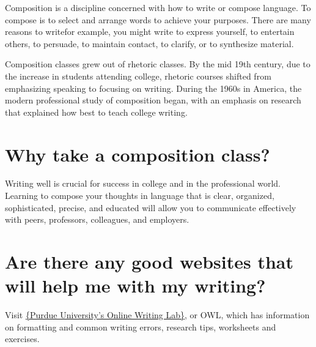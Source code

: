 Composition is a discipline concerned with how to write or compose language. To 
compose is to select and arrange words to achieve your purposes. There are many 
reasons to write\textemdash for example, you might write to express yourself, to entertain others, 
to persuade, to maintain contact, to clarify, or to synthesize material.

Composition classes grew out of rhetoric classes. By the mid 19th century, due to the 
increase in students attending college, rhetoric courses shifted from emphasizing 
speaking to focusing on writing. During the 1960s in America, the modern professional 
study of composition began, with an emphasis on research that explained how best to 
teach college writing.
 
\section{Why take a composition class?}

Writing well is crucial for success in college and in the professional world. Learning to 
compose your thoughts in language that is clear, organized, sophisticated, precise, and 
educated will allow you to communicate effectively with peers, professors, colleagues, 
and employers.


\section{Are there any good websites that will help me with my writing?}
Visit \href{http://owl.english.purdue.edu}{\{Purdue University's Online Writing Lab\}}, or 
OWL, which has information on formatting and common writing errors, research tips, 
worksheets and exercises.


